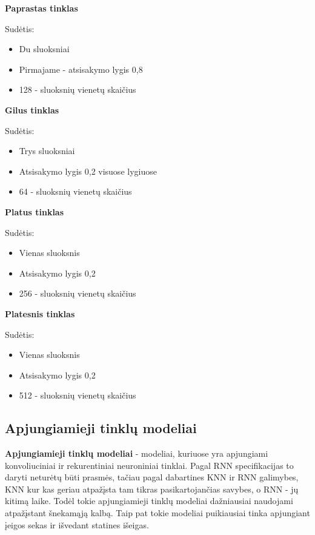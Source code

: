 \documentclass{VUMIFPSbakalaurinis}
\begin{document}
\textbf{Paprastas tinklas}

Sudėtis:
\begin{itemize}
	\item Du sluoksniai
	\item Pirmajame - atsisakymo lygis 0,8
	\item 128 - sluoksnių vienetų skaičius
\end{itemize}

\textbf{Gilus tinklas}

Sudėtis:
\begin{itemize}
	\item Trys sluoksniai
	\item Atsisakymo lygis 0,2 visuose lygiuose
	\item 64 - sluoksnių vienetų skaičius
\end{itemize}

\textbf{Platus tinklas}

Sudėtis:
\begin{itemize}
	\item Vienas sluoksnis
	\item Atsisakymo lygis 0,2
	\item 256 - sluoksnių vienetų skaičius
\end{itemize}

\textbf{Platesnis tinklas}

Sudėtis:
\begin{itemize}
	\item Vienas sluoksnis
	\item Atsisakymo lygis 0,2
	\item 512 - sluoksnių vienetų skaičius
\end{itemize}


\subsection{Apjungiamieji tinklų modeliai}

\textbf{Apjungiamieji tinklų modeliai} - modeliai, kuriuose yra apjungiami konvoliuciniai ir rekurentiniai neuroniniai tinklai. Pagal RNN specifikacijas to daryti neturėtų būti prasmės, tačiau pagal dabartines KNN ir RNN galimybes, KNN kur kas geriau atpažįsta tam tikras pasikartojančias savybes, o RNN - jų kitimą laike. Todėl tokie apjungiamieji tinklų modeliai dažniausiai naudojami atpažįstant šnekamąją kalbą. Taip pat tokie modeliai puikiausiai tinka apjungiant įeigos sekas ir išvedant statines išeigas. 
\end{document}
